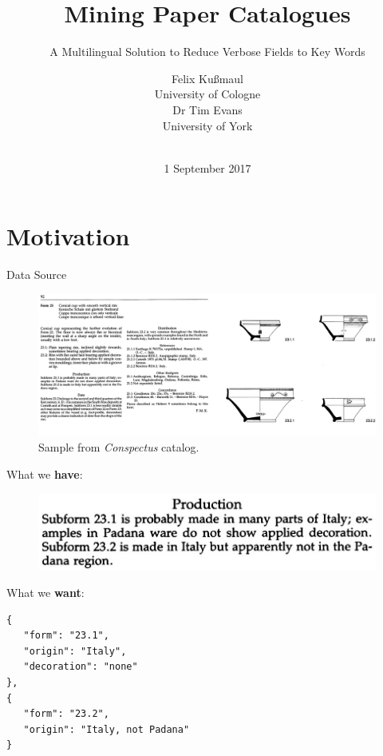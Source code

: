 \documentclass[xcolor=x11names, aspectratio=169]{beamer}
\author[F.\ Kußmaul \&\ T.\ Evans]{{\Large Felix Kußmaul}\\[.2em]University of Cologne\\[1.2em]{\Large Dr Tim Evans}\\[.2em]University of York}
\title[Mining Paper Catalogues]{\Large Mining Paper Catalogues}
\subtitle{A Multilingual Solution to Reduce Verbose Fields to Key Words}
\institute[Cologne, York]{European Association of Archaeologists 2017}
\date[1 September 2017]{\ \\[.5em]1 September 2017}
\begin{document}
\maketitle

\section{Motivation}

\begin{frame}{Data Source}
\begin{center}
\begin{figure}
\includegraphics[width=.875\paperwidth]{img/consp.jpg}
\caption{Sample from \emph{Conspectus} catalog.}
\end{figure}
\end{center}
\end{frame}

\begin{frame}[fragile]{}
\begin{minipage}[t]{0.45\textwidth}
What we \textbf{have}:\bigskip

\begin{figure}
\includegraphics[width=1.05\textwidth]{img/consp_ex.jpg}
\end{figure}
\end{minipage}\hfill\pause
\begin{minipage}[t]{0.45\textwidth}
What we \textbf{want}:
{\footnotesize
\begin{verbatim}
{
   "form": "23.1",
   "origin": "Italy",
   "decoration": "none"
},
{
   "form": "23.2",
   "origin": "Italy, not Padana"
}
\end{verbatim}
}
\end{minipage}
\end{frame}
\end{document}
